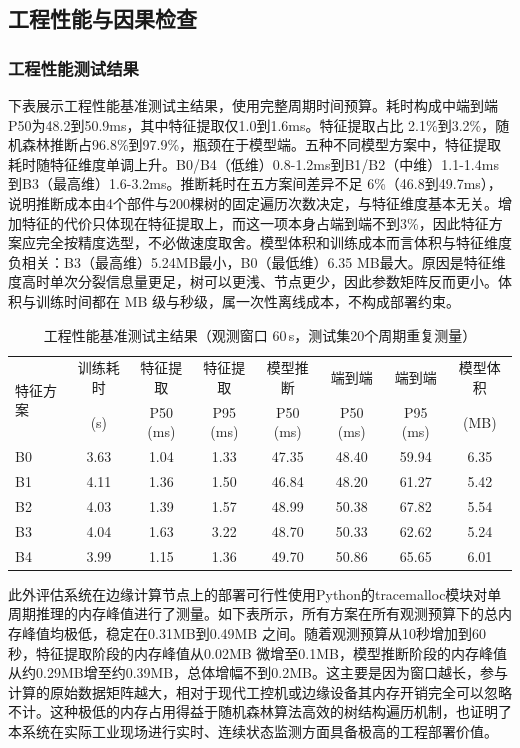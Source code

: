 \documentclass[12pt, a4paper]{ctexart}
\begin{document}
\subsection{工程性能与因果检查}
\subsubsection{工程性能测试结果}
下表展示工程性能基准测试主结果，使用完整周期时间预算。耗时构成中端到端P50为48.2到50.9ms‌，其中特征提取仅1.0到1.6ms‌。特征提取占比 ‌2.1\%到3.2\%，随机森林推断占96.8\%到97.9\%，瓶颈在于模型端。五种不同模型方案中，特征提取耗时随特征维度单调上升。B0/B4（低维）‌0.8-1.2ms‌到B1/B2（中维）‌1.1-1.4ms‌到B3（最高维）‌1.6-3.2ms‌。推断耗时在五方案间差异不足 6\%（46.8到49.7ms），说明推断成本由4个部件与200棵树的固定遍历次数决定，与特征维度基本无关。增加特征的代价只体现在特征提取上，而这一项本身占端到端不到3\%，因此‌特征方案应完全按精度选型，不必做速度取舍‌。模型体积和训练成本而言体积与特征维度‌负相关‌：B3（最高维）‌5.24MB‌最小，B0（最低维）‌6.35 MB‌最大。原因是特征维度高时单次分裂信息量更足，树可以更浅、节点更少，因此参数矩阵反而更小。体积与训练时间都在 MB 级与秒级，属一次性离线成本，不构成部署约束。
\begin{table}[H]
  \centering
  \caption{工程性能基准测试主结果（观测窗口 60\,s，测试集20个周期重复测量）}
  \label{tab:bench_60s}
  \small
  \setlength{\tabcolsep}{5pt}
  \begin{tabular}{lccccccc}
    \toprule
    \multirow{2}{*}{特征方案} & 训练耗时 & 特征提取 & 特征提取 & 模型推断 & 端到端 & 端到端 & 模型体积 \\
                              & (s)      & P50 (ms) & P95 (ms) & P50 (ms) & P50 (ms) & P95 (ms) & (MB) \\
    \midrule
    B0 & 3.63 & 1.04 & 1.33 & 47.35 & 48.40 & 59.94 & 6.35 \\
    B1 & 4.11 & 1.36 & 1.50 & 46.84 & 48.20 & 61.27 & 5.42 \\
    B2 & 4.03 & 1.39 & 1.57 & 48.99 & 50.38 & 67.82 & 5.54 \\
    B3 & 4.04 & 1.63 & 3.22 & 48.70 & 50.33 & 62.62 & 5.24 \\
    B4 & 3.99 & 1.15 & 1.36 & 49.70 & 50.86 & 65.65 & 6.01 \\
    \bottomrule
  \end{tabular}
\end{table}
此外评估系统在边缘计算节点上的部署可行性使用Python的tracemalloc模块对单周期推理的内存峰值进行了测量。如下表所示，所有方案在所有观测预算下的总内存峰值均极低，稳定在0.31MB到0.49MB 之间。随着观测预算从10秒增加到60秒，特征提取阶段的内存峰值从0.02MB 微增至0.1MB，模型推断阶段的内存峰值从约0.29MB增至约0.39MB，总体增幅不到0.2MB。这主要是因为窗口越长，参与计算的原始数据矩阵越大，相对于现代工控机或边缘设备其内存开销完全可以忽略不计。这种极低的内存占用得益于随机森林算法高效的树结构遍历机制，也证明了本系统在实际工业现场进行实时、连续状态监测方面具备极高的工程部署价值。
\end{document}
